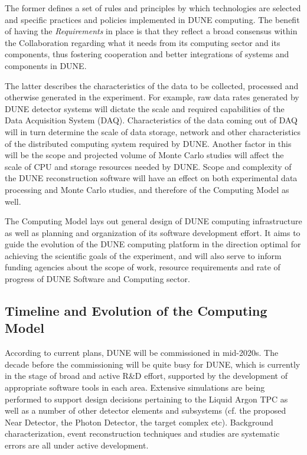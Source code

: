 \noindent
The former defines a set of rules and principles by which technologies are selected and specific practices and policies implemented in DUNE computing.
The benefit of having the \textit{Requirements} in place is that they reflect a broad consensus within the Collaboration regarding what it needs from
its computing sector and its components, thus fostering cooperation and better integrations of systems and components in DUNE.

The latter describes the characteristics of the data to be collected, processed and otherwise generated in the experiment.
For example, raw data rates generated by DUNE detector systems will dictate the scale and required capabilities of the Data
Acquisition System (DAQ).  Characteristics of the data coming out of DAQ will in turn determine the scale of data storage, network
and other characteristics of the distributed computing system required by DUNE. Another factor in this will be the scope and projected
volume of Monte Carlo studies  will affect the scale of CPU and storage resources needed by DUNE.  Scope and complexity of the DUNE
reconstruction software will have an effect on both experimental data processing and Monte Carlo studies, and therefore of the
Computing Model as well.

The Computing Model lays out general design of DUNE computing infrastructure as well as planning and
organization of its software development effort. It aims to guide the evolution of the DUNE computing
platform in the direction optimal for achieving the scientific goals of the experiment, and will also serve
to inform funding agencies about the scope of work, resource requirements and rate of progress of 
DUNE Software and Computing sector.

\subsection{Timeline and Evolution of the Computing Model}
According to current plans, DUNE will be commissioned in mid-2020s. The decade before the commissioning will be quite busy
for DUNE, which is currently in the stage of broad and active R\&D effort, supported by the development of appropriate 
software tools in each area. Extensive simulations are being performed to support design decisions pertaining to the Liquid 
Argon TPC as well as a number of other detector elements and subsystems (cf. the proposed Near Detector, the Photon Detector, 
the target complex etc). Background characterization, event reconstruction techniques and studies are systematic errors are all under active development.

